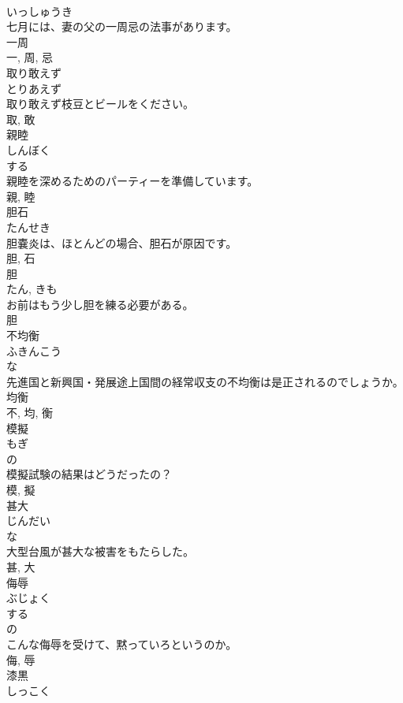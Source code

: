 \documentclass[8pt]{extreport}
\begin{document}
\begin{CJK}{UTF8}{min}
\\	いっしゅうき	
\\	七月には、妻の父の一周忌の法事があります。	
\\	一周 
\\	一, 周, 忌	
\\	取り敢えず	
\\	とりあえず	
\\	取り敢えず枝豆とビールをください。	
\\	取, 敢	
\\	親睦	
\\	しんぼく	
\\	する 
\\	親睦を深めるためのパーティーを準備しています。	
\\	親, 睦	
\\	胆石	
\\	たんせき	
\\	胆嚢炎は、ほとんどの場合、胆石が原因です。	
\\	胆, 石	
\\	胆	
\\	たん, きも	
\\	お前はもう少し胆を練る必要がある。	
\\	胆	
\\	不均衡	
\\	ふきんこう	
\\	な 
\\	先進国と新興国・発展途上国間の経常収支の不均衡は是正されるのでしょうか。	
\\	均衡 
\\	不, 均, 衡	
\\	模擬	
\\	もぎ	
\\	の 
\\	模擬試験の結果はどうだったの？	
\\	模, 擬	
\\	甚大	
\\	じんだい	
\\	な 
\\	大型台風が甚大な被害をもたらした。	
\\	甚, 大	
\\	侮辱	
\\	ぶじょく	
\\	する 
\\	の 
\\	こんな侮辱を受けて、黙っていろというのか。	
\\	侮, 辱	
\\	漆黒	
\\	しっこく	

\end{CJK}
\end{document}
